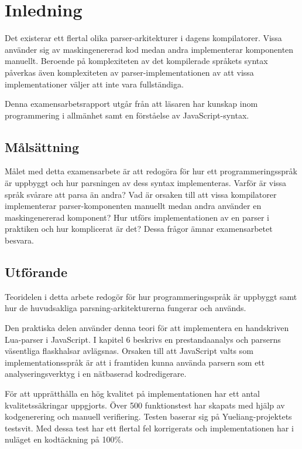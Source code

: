 \section{Inledning}

Det existerar ett flertal olika parser-arkitekturer i dagens kompilatorer.
Vissa använder sig av maskingenererad kod medan andra implementerar
komponenten manuellt. Beroende på komplexiteten av det kompilerade språkets
syntax påverkas även komplexiteten av parser-implementationen av att
vissa implementationer väljer att inte vara fullständiga.

Denna examensarbetsrapport utgår från att läsaren har kunskap inom
programmering i allmänhet samt en förståelse av JavaScript-syntax.

\subsection{Målsättning}

Målet med detta examensarbete är att redogöra för hur ett programmeringsspråk
är uppbyggt och hur parsningen av dess syntax implementeras. Varför är vissa
språk svårare att parsa än andra? Vad är orsaken till att vissa kompilatorer
implementerar parser-komponenten manuellt medan andra använder en
maskingenererad komponent? Hur utförs implementationen av en parser i
praktiken och hur komplicerat är det? Dessa frågor ämnar examensarbetet
besvara.

\subsection{Utförande}

Teoridelen i detta arbete redogör för hur programmeringsspråk är uppbyggt
samt hur de huvudsakliga parsning-arkitekturerna fungerar och används.

Den praktiska delen använder denna teori för att implementera en handskriven
Lua-parser i JavaScript. I kapitel 6 beskrivs en prestandaanalys och parserns
väsentliga flaskhalsar avlägsnas. Orsaken till att JavaScript valts som
implementationsspråk är att i framtiden kunna använda parsern som ett
analyseringsverktyg i en nätbaserad kodredigerare.

För att upprätthålla en hög kvalitet på implementationen har ett antal
kvalitetssäkringar uppgjorts. Över 500 funktionstest har skapats med hjälp av
kodgenerering och manuell verifiering. Testen baserar sig på
Yueliang-projektets testsvit. Med dessa test har ett flertal fel korrigerats
och implementationen har i nuläget en kodtäckning på 100\%.


